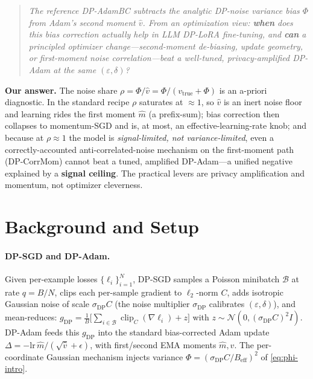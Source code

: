 \documentclass[11pt]{article}
\newcommand{\clip}{\operatorname{clip}}
\theoremstyle{plain}
\theoremstyle{definition}
\theoremstyle{remark}
\begin{document}
\begin{quote}
\itshape
The reference DP-AdamBC \citep{tang2024dpadambc} subtracts the analytic DP-noise variance bias
$\Phi$ from Adam's second moment $\hat v$. From an optimization view:
\textbf{when} does this bias correction actually help in LLM DP-LoRA fine-tuning, and
\textbf{can} a principled optimizer change---second-moment de-biasing, update geometry, or
first-moment noise correlation---beat a well-tuned, privacy-amplified DP-Adam at the same
$(\varepsilon,\delta)$?
\end{quote}

\noindent
\textbf{Our answer.} The noise share $\rho=\Phi/\hat v=\Phi/(v_{\mathrm{true}}+\Phi)$ is an a-priori
diagnostic. In the standard recipe $\rho$ saturates at $\approx 1$, so $\hat v$ is an inert noise
floor and learning rides the first moment $\hat m$ (a prefix-sum); bias correction then collapses to
momentum-SGD and is, at most, an effective-learning-rate knob; and because at $\rho\!\approx\!1$ the
model is \emph{signal-limited, not variance-limited}, even a correctly-accounted anti-correlated-noise
mechanism on the first-moment path (DP-CorrMom) cannot beat a tuned, amplified DP-Adam---a unified
negative explained by a \textbf{signal ceiling}. The practical levers are privacy amplification and
momentum, not optimizer cleverness.

\section{Background and Setup}
\label{sec:setup}

\paragraph{DP-SGD and DP-Adam.}
Given per-example losses $\{\ell_i\}_{i=1}^N$, DP-SGD samples a Poisson minibatch
$\mathcal B$ at rate $q=B/N$, clips each per-sample gradient to $\ell_2$-norm $C$, adds
isotropic Gaussian noise of scale $\sigma_{\mathrm{DP}}C$ (the noise multiplier $\sigma_{\mathrm{DP}}$
calibrates $(\varepsilon,\delta)$), and mean-reduces:
$g_{\mathrm{DP}}=\tfrac1{B}\big[\sum_{i\in\mathcal B}\clip_C(\nabla\ell_i)+z\big]$ with
$z\sim\mathcal N(0,(\sigma_{\mathrm{DP}}C)^2 I)$. DP-Adam feeds this $g_{\mathrm{DP}}$ into the
standard bias-corrected Adam update $\Delta=-\mathrm{lr}\,\hat m/(\sqrt{\hat v}+\epsilon)$, with
first/second EMA moments $\hat m,\hat v$. The per-coordinate Gaussian mechanism injects variance
$\Phi=(\sigma_{\mathrm{DP}}C/B_{\mathrm{eff}})^2$ of \eqref{eq:phi-intro}.
\end{document}
